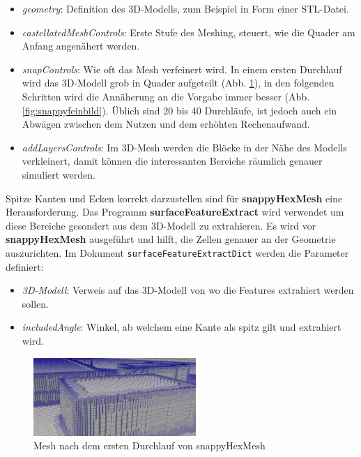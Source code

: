 \begin{itemize}
    \item \textit{geometry}: Definition des 3D-Modells, zum Beispiel in Form einer STL-Datei.
    \item \textit{castellatedMeshControls}: Erste Stufe des Meshing, steuert, wie die Quader am Anfang angenähert werden.
    \item \textit{snapControls}: Wie oft das Mesh verfeinert wird. 
    In einem ersten Durchlauf wird das 3D-Modell grob in Quader aufgeteilt (Abb. \ref{fig:snappygrobbild}),
    in den folgenden Schritten wird die Annäherung an die Vorgabe immer besser (Abb. \ref{fig:snappyfeinbild}).
    Üblich sind 20 bis 40 Durchläufe, ist jedoch auch ein Abwägen zwischen dem Nutzen und dem erhöhten Rechenaufwand.
    \item \textit{addLayersControls}: Im 3D-Mesh werden die Blöcke in der Nähe des Modells verkleinert, 
    damit können die interessanten Bereiche räumlich genauer simuliert werden.
\end{itemize}
Spitze Kanten und Ecken korrekt darzustellen sind für \textbf{snappyHexMesh} eine Herausforderung.
Das Programm \textbf{surfaceFeatureExtract} wird verwendet um diese Bereiche gesondert aus dem 3D-Modell zu extrahieren.
Es wird vor \textbf{snappyHexMesh} ausgeführt und hilft, die Zellen genauer an der Geometrie auszurichten.
Im Dokument \texttt{surfaceFeatureExtractDict} werden die Parameter definiert:

\begin{itemize}
    \item \textit{3D-Modell}: Verweis auf das 3D-Modell von wo die Features extrahiert werden sollen.
    \item \textit{includedAngle}: Winkel, ab welchem eine Kante als spitz gilt und extrahiert wird.
\end{itemize}

\begin{figure}
    \centering
    \includegraphics[width=0.55\textwidth]{papers/openfoam/Bilder/Snappy_grob.png}
    \caption{Mesh nach dem ersten Durchlauf von snappyHexMesh}
    \label{fig:snappygrobbild}
\end{figure}

